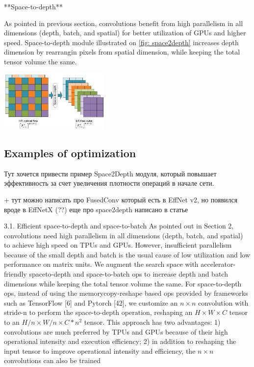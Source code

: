 **Space-to-depth**  

As pointed in previous section, convolutions benefit from high parallelism in all dimensions (depth, batch, and spatial) for better utilization of GPUs and higher speed. Space-to-depth module illustrated on \ref{fig: space2depth} increases depth dimension by rearrangin pixels from spatial dimension, while keeping the total tensor volume the same. 


\includegraphics[height=3cm]{images/space2depth.pdf}\label{fig: space2depth}



\subsection{Examples of optimization}
Тут хочется привести пример Space2Depth модуля, который повышает эффективность за счет увеличения плотности операций в начале сети. 

 + тут можно написать про FusedConv который есть в EffNet v2, но появился вроде в EffNetX (??) 
еще про space2depth написано в статье \cite{ridnik2021_tresnet}


3.1. Efficient space-to-depth and space-to-batch
As pointed out in Section 2, convolutions need high parallelism in all dimensions (depth, batch, and spatial) to achieve high speed on TPUs and GPUs. However, insufficient parallelism because of the small depth and batch is the usual cause of low utilization and low performance on matrix units. We augment the search space with accelerator-friendly spaceto-depth and space-to-batch ops to increase depth and batch dimensions while keeping the total tensor volume the same. For space-to-depth ops, instead of using the memorycopy-reshape based ops provided by frameworks such as TensorFlow [6] and Pytorch [42], we customize an $n \times n$ convolution with stride-n to perform the space-to-depth operation, reshaping an $H \times W \times C$ tensor to an $H / n \times W / n \times C * n^{2}$ tensor. This approach has two advantages: 1) convolutions are much preferred by TPUs and GPUs because of their high operational intensity and execution efficiency; 2) in addition to reshaping the input tensor to improve operational intensity and efficiency, the $n \times n$ convolutions can also be trained
 